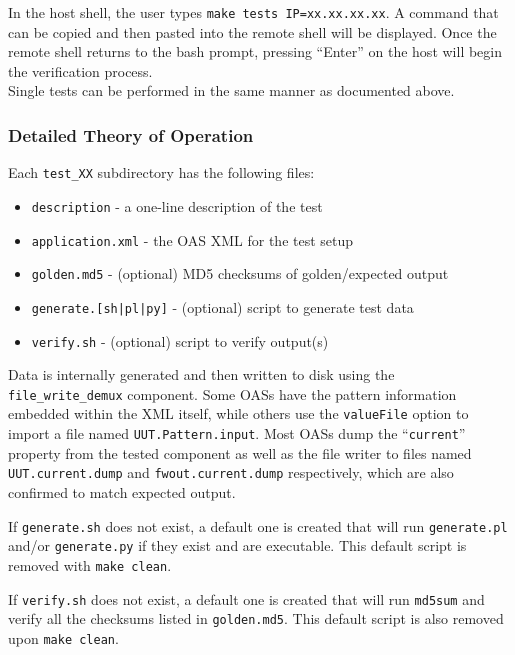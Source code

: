 \documentclass{article}
\begin{document}
In the host shell, the user types \verb+make tests IP=xx.xx.xx.xx+. A command that can be copied and then pasted into the remote shell will be displayed. Once the remote shell returns to the bash prompt, pressing ``Enter'' on the host will begin the verification process. \\

Single tests can be performed in the same manner as documented above.

\subsubsection*{Detailed Theory of Operation}
Each \verb+test_XX+ subdirectory has the following files:

\begin{itemize}{}{}
	\item \texttt{description} - a one-line description of the test
	\item \texttt{application.xml} - the OAS XML for the test setup
	\item \texttt{golden.md5} - (optional) MD5 checksums of golden/expected output
	\item \texttt{generate.[sh|pl|py]} - (optional) script to generate test data
	\item \texttt{verify.sh} - (optional) script to verify output(s)
\end{itemize}
\begin{flushleft}
	Data is internally generated and then written to disk using the \verb+file_write_demux+ component. Some OASs have the pattern information embedded within the XML itself, while others use the \texttt{valueFile} option to import a file named \verb+UUT.Pattern.input+. Most OASs dump the ``\texttt{current}'' property from the tested component as well as the file writer to files named \verb+UUT.current.dump+ and \verb+fwout.current.dump+ respectively, which are also confirmed to match expected output.
	\medskip

	If \texttt{generate.sh} does not exist, a default one is created that will run \texttt{generate.pl} and/or \texttt{generate.py} if they exist and are executable. This default script is removed with \verb+make clean+.
	\medskip

	If \texttt{verify.sh} does not exist, a default one is created that will run \texttt{md5sum} and verify all the checksums listed in \texttt{golden.md5}. This default script is also removed upon \verb+make clean+.
	\medskip
\end{flushleft}
\end{document}
